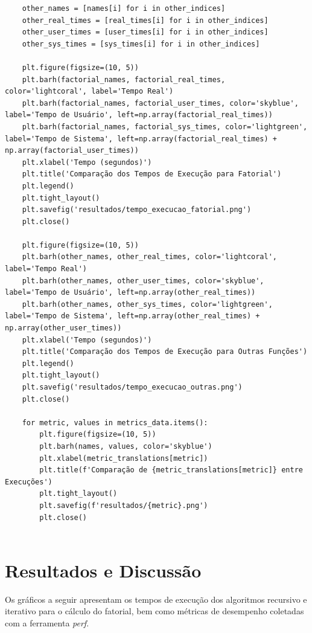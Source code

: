 \documentclass[12pt]{article}
\begin{document}
\begin{verbatim}
    other_names = [names[i] for i in other_indices]
    other_real_times = [real_times[i] for i in other_indices]
    other_user_times = [user_times[i] for i in other_indices]
    other_sys_times = [sys_times[i] for i in other_indices]
    
    plt.figure(figsize=(10, 5))
    plt.barh(factorial_names, factorial_real_times, color='lightcoral', label='Tempo Real')
    plt.barh(factorial_names, factorial_user_times, color='skyblue', label='Tempo de Usuário', left=np.array(factorial_real_times))
    plt.barh(factorial_names, factorial_sys_times, color='lightgreen', label='Tempo de Sistema', left=np.array(factorial_real_times) + np.array(factorial_user_times))
    plt.xlabel('Tempo (segundos)')
    plt.title('Comparação dos Tempos de Execução para Fatorial')
    plt.legend()
    plt.tight_layout()
    plt.savefig('resultados/tempo_execucao_fatorial.png')
    plt.close()
    
    plt.figure(figsize=(10, 5))
    plt.barh(other_names, other_real_times, color='lightcoral', label='Tempo Real')
    plt.barh(other_names, other_user_times, color='skyblue', label='Tempo de Usuário', left=np.array(other_real_times))
    plt.barh(other_names, other_sys_times, color='lightgreen', label='Tempo de Sistema', left=np.array(other_real_times) + np.array(other_user_times))
    plt.xlabel('Tempo (segundos)')
    plt.title('Comparação dos Tempos de Execução para Outras Funções')
    plt.legend()
    plt.tight_layout()
    plt.savefig('resultados/tempo_execucao_outras.png')
    plt.close()
    
    for metric, values in metrics_data.items():
        plt.figure(figsize=(10, 5))
        plt.barh(names, values, color='skyblue')
        plt.xlabel(metric_translations[metric])
        plt.title(f'Comparação de {metric_translations[metric]} entre Execuções')
        plt.tight_layout()
        plt.savefig(f'resultados/{metric}.png')
        plt.close()
    
\end{verbatim}

\newpage

\section{Resultados e Discussão}
Os gráficos a seguir apresentam os tempos de execução dos algoritmos recursivo e iterativo para o cálculo do fatorial, bem como métricas de desempenho coletadas com a ferramenta \textit{perf}.
\end{document}
